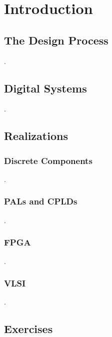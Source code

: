 \chapter{Introduction}

\section{The Design Process}
\pagebreak
.

\section{Digital Systems}
.\pagebreak

\section{Realizations}

\subsection{Discrete Components}
.\pagebreak

\subsection{PALs and CPLDs}
.\pagebreak

\subsection{FPGA}
\pagebreak
.
\subsection{VLSI}
\pagebreak
.
\section{Exercises}

